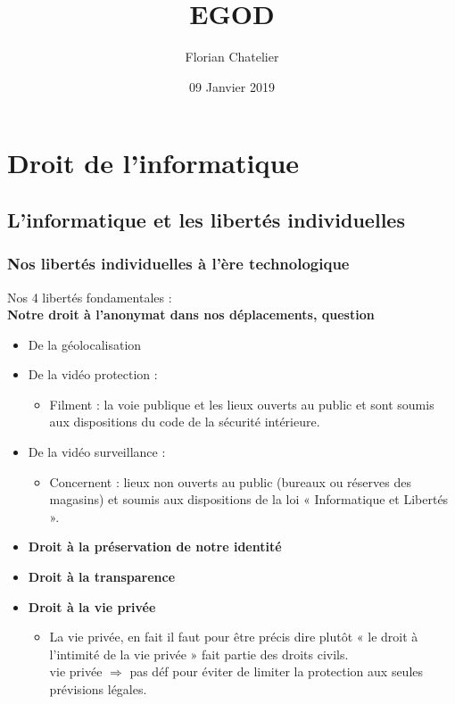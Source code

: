 \documentclass[a4paper,11pt]{report}
\title{EGOD}
\author{Florian Chatelier}
\date{09 Janvier 2019}
\begin{document}
\part{Droit de l'informatique}
\tableofcontents
\chapter{L'informatique et les libertés individuelles}
\section{Nos libertés individuelles à l'ère technologique}
Nos 4 libertés fondamentales : \\

\textbf{Notre droit à l’anonymat dans nos déplacements, question}
\begin{itemize}
    \item De la géolocalisation
    \item De la vidéo protection :
    \begin{itemize}
        \item Filment : la voie publique et les lieux ouverts au public et sont soumis aux dispositions du code de la sécurité intérieure.        
    \end{itemize}
    \item De la vidéo surveillance :
    \begin{itemize}
        \item Concernent : lieux non ouverts au public (bureaux ou réserves des magasins) et soumis aux dispositions de la loi « Informatique et Libertés ». 
    \end{itemize}
    \item \textbf{Droit à la préservation de notre identité}
    \item \textbf{Droit à la transparence}
    \item \textbf{Droit à la vie privée}
    \begin{itemize}
        \item La vie privée, en fait il faut pour être précis dire plutôt « le droit à l’intimité de la vie privée » fait partie des droits civils. \\
        vie privée $\Rightarrow$ pas déf pour éviter de limiter la protection aux seules prévisions légales. \\

    \end{itemize}
\end{itemize}
\end{document}

